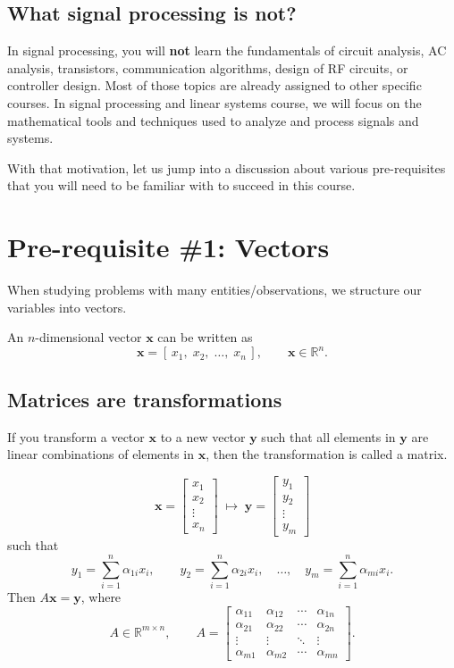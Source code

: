 \documentclass{ee102_notes}
\begin{document}
\subsection{What signal processing is not?}
In signal processing, you will \textbf{not} learn the fundamentals of circuit analysis, AC analysis, transistors, communication algorithms, design of RF circuits, or controller design. Most of those topics are already assigned to other specific courses. In signal processing and linear systems course, we will focus on the mathematical tools and techniques used to analyze and process signals and systems.

With that motivation, let us jump into a discussion about various pre-requisites that you will need to be familiar with to succeed in this course.
\section{Pre-requisite \#1: Vectors}
When studying problems with many entities/observations, we structure our variables into vectors.

An $n$-dimensional vector $\mathbf{x}$ can be written as
\[
\mathbf{x}=[\,x_1,\;x_2,\;\ldots,\;x_n\,], \qquad \mathbf{x}\in\mathbb{R}^n .
\]

\subsection{Matrices are transformations}
If you transform a vector $\mathbf{x}$ to a new vector $\mathbf{y}$ such that all elements in $\mathbf{y}$ are linear combinations of elements in $\mathbf{x}$, then the transformation is called a matrix.

\[
\mathbf{x}=
\begin{bmatrix}
x_1\\ x_2\\ \vdots\\ x_n
\end{bmatrix}
\;\longmapsto\;
\mathbf{y}=
\begin{bmatrix}
y_1\\ y_2\\ \vdots\\ y_m
\end{bmatrix}
\]
such that
\[
y_1=\sum_{i=1}^{n}\alpha_{1i}x_i,\qquad
y_2=\sum_{i=1}^{n}\alpha_{2i}x_i,\quad \ldots,\quad
y_m=\sum_{i=1}^{n}\alpha_{mi}x_i .
\]
Then $A\mathbf{x}=\mathbf{y}$, where
\[
A\in\mathbb{R}^{m\times n}, \qquad
A=
\begin{bmatrix}
\alpha_{11} & \alpha_{12} & \cdots & \alpha_{1n}\\
\alpha_{21} & \alpha_{22} & \cdots & \alpha_{2n}\\
\vdots      & \vdots      & \ddots & \vdots\\
\alpha_{m1} & \alpha_{m2} & \cdots & \alpha_{mn}
\end{bmatrix}.
\]
\end{document}
